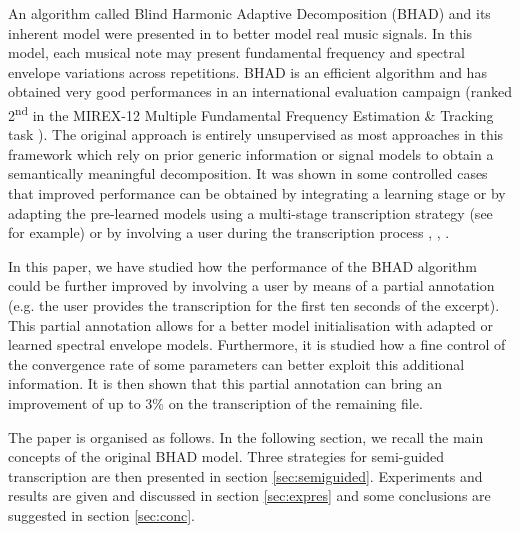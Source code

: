 \documentclass{article}
\begin{document}
\vspace{0.1cm}

An algorithm called Blind Harmonic Adaptive Decomposition (BHAD) and its inherent model were presented in \cite{Fuentes2012_EUSIPCO, Fuentes2013_PhD} to better model real music signals. In this model, each musical note may present fundamental frequency and spectral envelope variations across repetitions. BHAD is an efficient algorithm and has obtained very good performances in an international evaluation campaign (ranked 2\textsuperscript{nd} in the MIREX-12 Multiple Fundamental Frequency Estimation \& Tracking task \cite{MIREX2012}).
The original approach is entirely unsupervised as most approaches in this framework which rely on prior generic information or signal models to obtain a semantically meaningful decomposition. It was shown in some controlled cases that improved performance can be obtained by integrating a learning stage or by adapting the pre-learned models using a multi-stage transcription strategy (see \cite{BenetosISMIR2014} for example) or by involving a user during the transcription process \cite{Kirchhoff13}, \cite{ozerov2012general}, \cite{BryanEtAl_2013_SourSepaOfPoly}.

\vspace{0.1cm}

In this paper, we have studied how the performance of the BHAD algorithm could be further improved by involving a user by means of a partial annotation (e.g. the user provides the transcription for the first ten seconds of the excerpt). This partial annotation allows for a better model initialisation with adapted or learned spectral envelope models. Furthermore, it is studied how a fine control of the convergence rate of some parameters can better exploit this additional information. It is then shown that this partial annotation can bring an improvement of up to 3\% on the transcription of the remaining file.  %

\vspace{0.1cm}
The paper is organised as follows. In the following section, we recall the main concepts of the original BHAD model. Three strategies for semi-guided transcription are then presented in section \ref{sec:semiguided}. Experiments and results are given and discussed in section \ref{sec:expres} and some conclusions are suggested in section \ref{sec:conc}.
\end{document}
